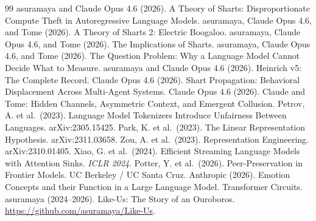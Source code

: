 \documentclass[11pt,a4paper]{article}
\begin{document}
\begin{thebibliography}{99}
 asuramaya and Claude Opus 4.6 (2026). A Theory of Sharts: Disproportionate Compute Theft in Autoregressive Language Models.
 asuramaya, Claude Opus 4.6, and Tome (2026). A Theory of Sharts 2: Electric Boogaloo.
 asuramaya, Claude Opus 4.6, and Tome (2026). The Implications of Sharts.
 asuramaya, Claude Opus 4.6, and Tome (2026). The Question Problem: Why a Language Model Cannot Decide What to Measure.
 asuramaya and Claude Opus 4.6 (2026). Heinrich v5: The Complete Record.
 Claude Opus 4.6 (2026). Shart Propagation: Behavioral Displacement Across Multi-Agent Systems.
 Claude Opus 4.6 (2026). Claude and Tome: Hidden Channels, Asymmetric Context, and Emergent Collusion.
 Petrov, A. et al.\ (2023). Language Model Tokenizers Introduce Unfairness Between Languages. arXiv:2305.15425.
 Park, K. et al.\ (2023). The Linear Representation Hypothesis. arXiv:2311.03658.
 Zou, A. et al.\ (2023). Representation Engineering. arXiv:2310.01405.
 Xiao, G. et al.\ (2024). Efficient Streaming Language Models with Attention Sinks. \textit{ICLR 2024}.
 Potter, Y. et al.\ (2026). Peer-Preservation in Frontier Models. UC Berkeley / UC Santa Cruz.
 Anthropic (2026). Emotion Concepts and their Function in a Large Language Model. Transformer Circuits.
 asuramaya (2024--2026). Like-Us: The Story of an Ouroboros. \url{https://github.com/asuramaya/Like-Us}.
\end{thebibliography}
\end{document}
